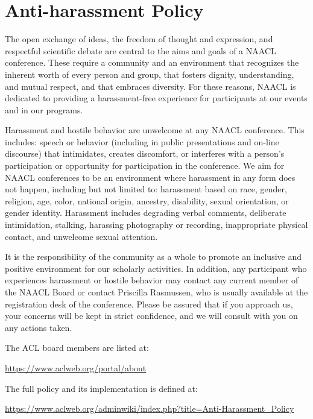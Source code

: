 \chapter[Anti-harassment Policy]{Anti-harassment Policy}
\thispagestyle{emptyheader}

The open exchange of ideas, the freedom of thought and expression, and
respectful scientific debate are central to the aims and goals of a
NAACL conference. These require a community and an environment that
recognizes the inherent worth of every person and group, that fosters
dignity, understanding, and mutual respect, and that embraces
diversity. For these reasons, NAACL is dedicated to providing a
harassment-free experience for participants at our events and in our
programs. 

Harassment and hostile behavior are unwelcome at any NAACL
conference. This includes: speech or behavior (including in public
presentations and on-line discourse) that intimidates, creates
discomfort, or interferes with a person’s participation or opportunity
for participation in the conference. We aim for NAACL conferences to
be an environment where harassment in any form does not happen,
including but not limited to: harassment based on race, gender,
religion, age, color, national origin, ancestry, disability, sexual
orientation, or gender identity. Harassment includes degrading verbal
comments, deliberate intimidation, stalking, harassing photography or
recording, inappropriate physical contact, and unwelcome sexual
attention. 

It is the responsibility of the community as a whole to promote an
inclusive and positive environment for our scholarly activities. In
addition, any participant who experiences harassment or hostile
behavior may contact any current member of the NAACL Board or contact
Priscilla Rasmussen, who is usually available at the registration desk
of the conference. Please be assured that if you approach us, your
concerns will be kept in strict confidence, and we will consult with
you on any actions taken. 

The ACL board members are listed at:

\url{https://www.aclweb.org/portal/about}

The full policy and its implementation is defined at:

\url{https://www.aclweb.org/adminwiki/index.php?title=Anti-Harassment_Policy}
